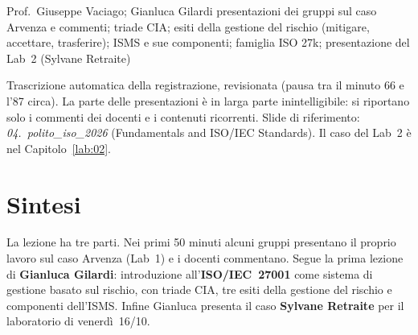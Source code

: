   {Prof.~Giuseppe Vaciago; Gianluca Gilardi}
  {presentazioni dei gruppi sul caso Arvenza e commenti; triade CIA; esiti della gestione del rischio
   (mitigare, accettare, trasferire); ISMS e sue componenti; famiglia ISO 27k; presentazione del
   Lab~2 (Sylvane Retraite)}
\label{lez:2026-10-12}

\begin{nota}[Fonte]
Trascrizione automatica della registrazione, revisionata (pausa tra il minuto 66 e l'87 circa). La
parte delle presentazioni è in larga parte inintelligibile: si riportano solo i commenti dei docenti
e i contenuti ricorrenti. Slide di riferimento: \emph{04.~polito\_iso\_2026} (Fundamentals and
ISO/IEC Standards). Il caso del Lab~2 è nel Capitolo~\ref{lab:02}.
\end{nota}

\section{Sintesi}
La lezione ha tre parti. Nei primi 50 minuti alcuni gruppi presentano il proprio lavoro sul caso
Arvenza (Lab~1) e i docenti commentano. Segue la prima lezione di \textbf{Gianluca Gilardi}:
introduzione all'\textbf{ISO/IEC~27001} come sistema di gestione basato sul rischio, con triade CIA,
tre esiti della gestione del rischio e componenti dell'ISMS. Infine Gianluca presenta il caso
\textbf{Sylvane Retraite} per il laboratorio di venerdì~16/10.

